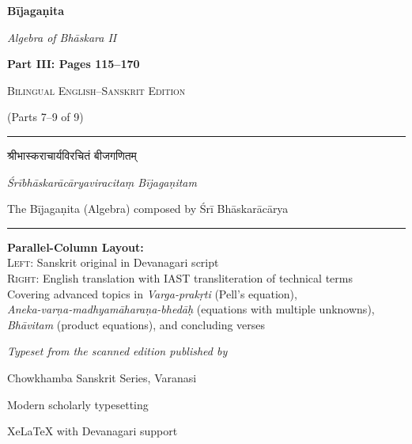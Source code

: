 \documentclass[11pt,a4paper]{article}
\newcommand{\shortline}{\noindent\rule{0.5\textwidth}{0.4pt}\par}
\newcommand{\dev}[1]{{\devanagarifont #1}}
\begin{document}
\begin{titlepage}
\centering
\vspace*{1.5cm}

{\Huge\bfseries\color{titlecolor} Bījagaṇita\par}
\vspace{0.5cm}
{\Large\itshape Algebra of Bhāskara II\par}
\vspace{1.5cm}

{\LARGE\bfseries Part III: Pages 115--170\par}
\vspace{0.3cm}
{\large \textsc{Bilingual English--Sanskrit Edition}\par}
\vspace{0.5cm}
{\normalsize (Parts 7--9 of 9)\par}
\vspace{0.8cm}

\shortline
\vspace{0.5cm}

{\large\dev{श्रीभास्कराचार्यविरचितं बीजगणितम्}\par}
\vspace{0.3cm}
{\normalsize \textit{Śrībhāskarācāryaviracitaṃ Bījagaṇitam}\par}
\vspace{0.5cm}
{\normalsize The Bījagaṇita (Algebra) composed by Śrī Bhāskarācārya\par}

\vspace{0.8cm}
\shortline
\vspace{0.5cm}

{\normalsize
\begin{minipage}{0.85\textwidth}
\centering
\textbf{Parallel-Column Layout:}\\[0.3em]
\textsc{Left:} Sanskrit original in Devanagari script\\[0.2em]
\textsc{Right:} English translation with IAST transliteration of technical terms\\[0.5em]
Covering advanced topics in \textit{Varga-prakṛti} (Pell's equation),\\
\textit{Aneka-varṇa-madhyamāharaṇa-bhedāḥ} (equations with multiple unknowns),\\
\textit{Bhāvitam} (product equations), and concluding verses
\end{minipage}
\par}

\vfill

{\small\textit{Typeset from the scanned edition published by}}\\[0.3em]
{\small Chowkhamba Sanskrit Series, Varanasi\par}
\vspace{1cm}
{\small Modern scholarly typesetting\par}
{\footnotesize XeLaTeX with Devanagari support\par}

\end{titlepage}
\end{document}
